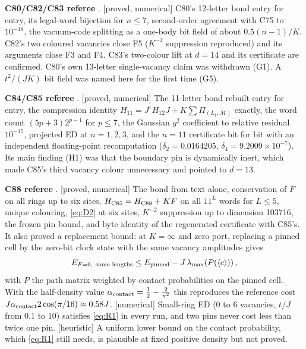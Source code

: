 \documentclass[11pt]{article}
\newcommand{\tg}[1]{\textsf{[#1]}}
\begin{document}
\textbf{C80/C82/C83 referee} \cite{refC80}. \tg{proved, numerical} C80's 12-letter bond entry for entry, its legal-word bijection for $n\le7$, second-order agreement with C75 to $10^{-18}$, the vacuum-code splitting as a one-body bit field of about $0.5(n-1)/K$. C82's two coloured vacancies close F5 ($K^{-2}$ suppression reproduced) and its arguments close F3 and F4. C83's two-colour lift at $d=14$ and its certificate are confirmed. C80's own 13-letter single-vacancy claim was withdrawn (G1). A $t^2/(JK)$ bit field was named here for the first time (G5).

\textbf{C84/C85 referee} \cite{refC84}. \tg{proved, numerical} The 11-letter bond rebuilt entry for entry, the compression identity $H_{11}=J^\dagger H_{12}J+K\sum\Pi_{(L_1,\mathcal{M})}$ exactly, the word count $(5p+3)2^{p-1}$ for $p\le7$, the Gaussian $g^2$ coefficient to relative residual $10^{-15}$, projected ED at $n=1,2,3$, and the $n=11$ certificate bit for bit with an independent floating-point recomputation ($\delta_2=0.0164205$, $\delta_4=9.2009\times10^{-7}$). Its main finding (H1) was that the boundary pin is dynamically inert, which made C85's third vacancy colour unnecessary and pointed to $d=13$.

\textbf{C88 referee} \cite{refC88}. \tg{proved, numerical} The bond from text alone, conservation of $F$ on all rings up to six sites, $H_{\rm C85}=H_{\rm C88}+KF$ on all $11^L$ words for $L\le5$, unique colouring, \eqref{eq:D2} at six sites, $K^{-2}$ suppression up to dimension 103716, the frozen pin bound, and byte identity of the regenerated certificate with C85's. It also proved a replacement bound: at $K=\infty$ and zero port, replacing a pinned cell by the zero-bit clock state with the same vacancy amplitudes gives
\begin{align}
E_{F=0,\ \text{same lengths}}\le E_{\rm pinned}-J\,\lambda_{\max}\!\left(P(\langle c\rangle)\right),\label{eq:R1}
\end{align}
with $P$ the path matrix weighted by contact probabilities on the pinned cell. With the half-density value $\alpha_{\rm contact}=\frac12-\frac{2}{\pi^2}$ this reproduces the reference cost $J\alpha_{\rm contact}2\cos(\pi/16)\approx0.58J$. \tg{numerical} Small-ring ED (0 to 6 vacancies, $t/J$ from $0.1$ to $10$) satisfies \eqref{eq:R1} in every run, and two pins never cost less than twice one pin. \tg{heuristic} A uniform lower bound on the contact probability, which \eqref{eq:R1} still needs, is plausible at fixed positive density but not proved.
\end{document}
